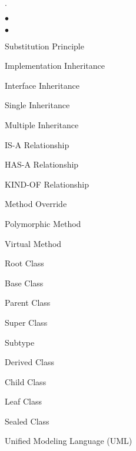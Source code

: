 \documentclass[11pt]{article}
\begin{document}
{\begin{list}{.}
\begin{list}{$\bullet$}{\itemsep 0.01in \parskip 0in \parsep 0in}
\begin{list}{$\bullet$}{\itemsep 0.01in \parskip 0in \parsep 0in}
                \item Substitution Principle

                \item Implementation Inheritance

                \item Interface Inheritance

                \item Single Inheritance

                \item Multiple Inheritance

                \item IS-A Relationship

                \item HAS-A Relationship

                \item KIND-OF Relationship

                \item Method Override

                \item Polymorphic Method

                \item Virtual Method

                \item Root Class

                \item Base Class

                \item Parent Class

                \item Super Class

                \item Subtype

                \item Derived Class

                \item Child Class

                \item Leaf Class

                \item Sealed Class

            \end{list}

    \end{list}

\item Unified Modeling Language (UML)


\end{list}}
\end{document}
